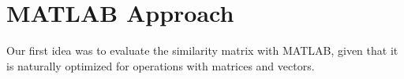 \section{MATLAB Approach}
Our first idea was to evaluate the similarity matrix with MATLAB, given that it is naturally optimized for operations with matrices and vectors.